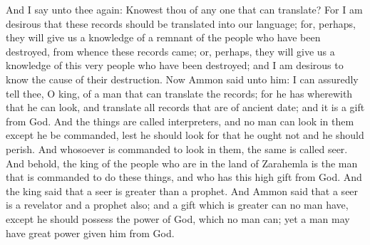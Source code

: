 \bverse \iffalse And I say unto thee again: Knowest thou of any one that can translate? For I am desirous that these records should be translated into our language; for, perhaps, they will give us a knowledge of a remnant of the people who have been destroyed, from whence these records came; or, perhaps, they will give us a knowledge of this very people who have been destroyed; and I am desirous to know the cause of their destruction. \fi
And I say unto thee again: Knowest thou of any one that can translate? For I am desirous that these records should be translated into our language; for, perhaps, they will give us a knowledge of a remnant of the people who have been destroyed, from whence these records came; or, perhaps, they will give us a knowledge of this very people who have been destroyed; and I am desirous to know the cause of their destruction.
\bverse \iffalse Now Ammon said unto him: I can assuredly tell thee, O king, of a man that can translate the records; for he has wherewith that he can look, and translate all records that are of ancient date; and it is a gift from God. And the things are called interpreters, and no man can look in them except he be commanded, lest he should look for that he ought not and he should perish.  And whosoever is commanded to look in them, the same is called seer. \fi
Now Ammon said unto him: I can assuredly tell thee, O king, of a man that can translate the records; for he has wherewith that he can look, and translate all records that are of ancient date; and it is a gift from God. And the things are called interpreters, and no man can look in them except he be commanded, lest he should look for that he ought not and he should perish.  And whosoever is commanded to look in them, the same is called seer.
\bverse \iffalse And behold, the king of the people who are in the land of Zarahemla is the man that is commanded to do these things, and who has this high gift from God. \fi
And behold, the king of the people who are in the land of Zarahemla is the man that is commanded to do these things, and who has this high gift from God.
\bverse \iffalse And the king said that a seer is greater than a prophet. \fi
And the king said that a seer is greater than a prophet.
\bverse \iffalse And Ammon said that a seer is a revelator and a prophet also; and a gift which is greater can no man have, except he should possess the power of God, which no man can; yet a man may have great power given him from God. \fi
And Ammon said that a seer is a revelator and a prophet also; and a gift which is greater can no man have, except he should possess the power of God, which no man can; yet a man may have great power given him from God.
